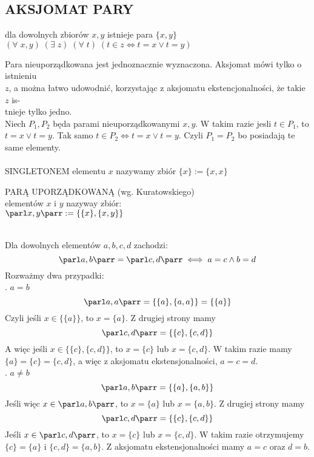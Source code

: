 \documentclass{article}
\begin{document}
\subsection{AKSJOMAT PARY}
\begin{center}\large
    dla dowolnych zbiorów $x, y$ istnieje para $\{x, y\}$\smallskip\\
    $(\forall\;x,y)\;(\exists\;z)\;(\forall\;t)\;(t\in z\iff t=x\lor t=y)$
\end{center}
{\color{acc}Para nieuporządkowana jest jednoznacznie wyznaczona}. Aksjomat mówi tylko o istnieniu \\$z$, a można łatwo udowodnić, korzystając z aksjomatu ekstencjonalności, że takie $z$ is-\\tnieje tylko jedno.\medskip\\
Niech $P_1, P_2$ będa parami nieuporządkowanymi $x, y$. W takim razie jesli $t\in P_1$, to $t=x\lor t=y$. Tak samo $t\in P_2\iff t=x\lor t=y$. Czyli $P_1=P_2$ bo posiadają te same elementy. \bigskip\\
\bigskip\\
{\color{def}SINGLETONEM} elementu $x$ nazywamy zbiór $\{x\}:=\{x, x\}$\bigskip
\begin{center}\large
    {\color{def}PARĄ UPORZĄDKOWANĄ} (wg. Kuratowskiego) \\elementów $x$ i $y$ nazyway zbiór:\smallskip\\
    $\parl x,y\parr := \{\{x\}, \{x,y\}\}$
\end{center}\medskip
{}\medskip\\
Dla dowolnych elementów $a, b, c, d$ zachodzi:
$$\parl a, b\parr = \parl c,d\parr \iff a=c\land b=d$$
\dowod
Rozważmy dwa przypadki:\medskip\\
. $a=b$\\
$$\parl a,a\parr = \{\{a\}, \{a, a\}\} = \{\{a\}\}$$
Czyli jeśli $x\in \{\{a\}\}$, to $x=\{a\}$. Z drugiej strony mamy 
$$\parl c, d\parr=\{\{c\}, \{c,d\}\}$$
A więc jeśli $x\in \{\{c\}, \{c,d\}\}$, to $x=\{c\}$ lub $x=\{c, d\}$. W takim razie mamy $\{a\}=\{c\}=\{c, d\}$, a więc z aksjomatu ekstensjonalności, $a=c=d$.\medskip\\
. $a\neq b$
$$\parl a, b\parr = \{\{a\}, \{a, b\}\}$$
Jeśli więc $x\in \parl a, b\parr$, to $x=\{a\}$ lub $x=\{a, b\}$. Z drugiej strony mamy
$$\parl c, d\parr=\{\{c\}, \{c, d\}\}$$
Jeśli $x\in \parl c,d\parr$, to $x=\{c\}$ lub $x=\{c, d\}$. W takim razie otrzymujemy $\{c\}=\{a\}$ i $\{c, d\}=\{a, b\}$. Z aksjomatu ekstensjonalności mamy $a=c$ oraz $d=b$.
\kondow
\end{document}
